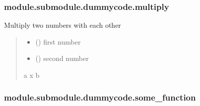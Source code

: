 \documentclass[letterpaper,10pt,english]{sphinxmanual}
\begin{document}
\sphinxstepscope


\subsubsection{module.submodule.dummycode.multiply}
\label{\detokenize{_autosummary/module.submodule.dummycode.multiply:module-submodule-dummycode-multiply}}\label{\detokenize{_autosummary/module.submodule.dummycode.multiply::doc}}

\begin{fulllineitems}
\label{\detokenize{_autosummary/module.submodule.dummycode.multiply:module.submodule.dummycode.multiply}}
\pysigstartsignatures
{}
\pysigstopsignatures
\sphinxAtStartPar
Multiply two numbers with each other
\begin{quote}\begin{description}
\begin{itemize}
\item {} 
\sphinxAtStartPar
{} () \textendash{} first number

\item {} 
\sphinxAtStartPar
{} () \textendash{} second number

\end{itemize}

\sphinxAtStartPar
a x b

\sphinxAtStartPar
{}

\end{description}\end{quote}

\end{fulllineitems}


\sphinxstepscope


\subsubsection{module.submodule.dummycode.some\_function}
\label{\detokenize{_autosummary/module.submodule.dummycode.some_function:module-submodule-dummycode-some-function}}\label{\detokenize{_autosummary/module.submodule.dummycode.some_function::doc}}
\end{document}
